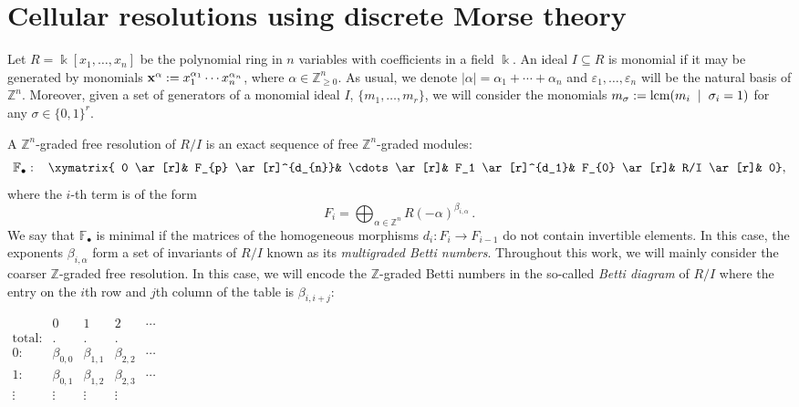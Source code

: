 \documentclass[12pt]{amsart}
\theoremstyle{definition}
\theoremstyle{remark}
\numberwithin{equation}{section}
\newcommand{\bZ}{{\mathbb{Z}}}
\newcommand\kk{\Bbbk}
\begin{document}
\section{Cellular resolutions using discrete Morse theory} \label{cellular}

Let $R=\kk[x_1, \ldots, x_n]$ be the polynomial ring in $n$ variables with coefficients
in a field $\kk$. An ideal $I\subseteq R$ is monomial if it may be generated
by monomials ${\bf x}^\alpha:=x_1^{\alpha_1}\cdots x_n^{\alpha_n}$, where $\alpha \in \bZ_{\geq 0}^n$.
As usual, we denote $|\alpha|= {\alpha_1}+\cdots +{\alpha_n}$ and $\varepsilon_1,\dots,\varepsilon_n$
will be the natural basis of $\bZ^n$. Moreover, given a set of generators of a monomial ideal $I$, $\{m_1,\dots,m_r\}$,
we will consider  the monomials $m_{\sigma}:={\rm lcm}(m_i \hskip 2mm | \hskip 2mm \sigma_i=1)$ for any $\sigma \in \{0,1\}^r$.

\vskip 2mm

A $\bZ^n$-graded free resolution of $R/I$ is an exact sequence of free $\bZ^n$-graded
modules:
\begin{equation}\label{resolution of I}
\mathbb{F}_{\bullet}: \hskip 3mm \xymatrix{ 0 \ar[r]& F_{p}
\ar[r]^{d_{n}}& \cdots \ar[r]& F_1 \ar[r]^{d_1}& F_{0} \ar[r]& R/I
\ar[r]& 0},
\end{equation}
where the $i$-th term is of the form
$$F_i =\bigoplus_{\alpha \in \bZ^n} R(-\alpha)^{\beta_{i,\alpha}}\,.$$
We say that $\mathbb{F}_{\bullet}$ is minimal if the matrices of the
homogeneous morphisms $d_i: F_i\longrightarrow F_{i-1}$ do not contain
invertible elements. In this case, the exponents $\beta_{i,\alpha}$ form a
set of invariants of $R/I$ known as its {\it multigraded Betti numbers}.
Throughout this work, we will mainly consider the coarser $\bZ$-graded free resolution. In this case, we
will encode the $\bZ$-graded Betti numbers in the so-called  {\it Betti diagram} of $R/I$ where the entry
on the $i$th row and $j$th column of the table is $ \beta_{i,i+j}$:

\begin{center}
 $\begin{matrix}
&0&1&2&\cdots \\ \text{total:}& \text{.} &\text{.}&\text{.}& \\
\text{0:} & \beta_{0,0} & \beta_{1,1} & \beta_{2,2} & \cdots \\\text{1:}& \beta_{0,1} & \beta_{1,2} & \beta_{2,3} & \cdots \\
\vdots& \vdots & \vdots & \vdots \\\end{matrix}
$
\end{center}
\end{document}
